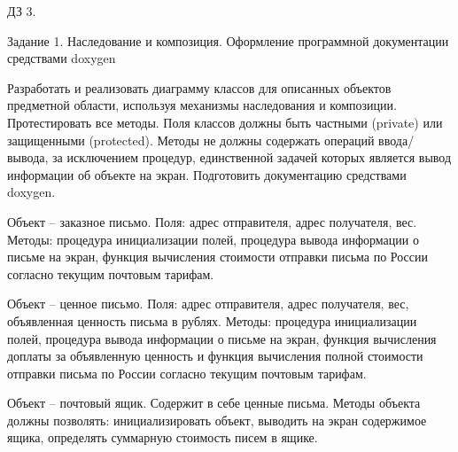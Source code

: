 ДЗ 3.

Задание 1. Наследование и композиция. Оформление программной документации средствами doxygen

Разработать и реализовать диаграмму классов для описанных объектов предметной области, используя механизмы наследования и композиции. Протестировать все методы. Поля классов должны быть частными (private) или защищенными (protected). Методы не должны содержать операций ввода/вывода, за исключением процедур, единственной задачей которых является вывод информации об объекте на экран. Подготовить документацию средствами doxygen.

Объект – заказное письмо. Поля\+: адрес отправителя, адрес получателя, вес. Методы\+: процедура инициализации полей, процедура вывода информации о письме на экран, функция вычисления стоимости отправки письма по России согласно текущим почтовым тарифам.

Объект – ценное письмо. Поля\+: адрес отправителя, адрес получателя, вес, объявленная ценность письма в рублях. Методы\+: процедура инициализации полей, процедура вывода информации о письме на экран, функция вычисления доплаты за объявленную ценность и функция вычисления полной стоимости отправки письма по России согласно текущим почтовым тарифам.

Объект – почтовый ящик. Содержит в себе ценные письма. Методы объекта должны позволять\+: инициализировать объект, выводить на экран содержимое ящика, определять суммарную стоимость писем в ящике. 